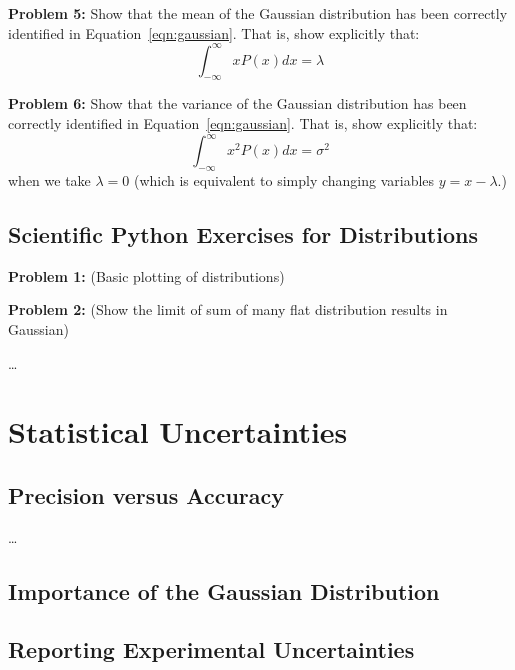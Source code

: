 \documentclass[12pt]{article}
\begin{document}
\vskip 1cm
\noindent
{\bf Problem 5:} Show that the mean of the Gaussian distribution has been correctly identified in Equation~\ref{eqn:gaussian}.  That is, show explicitly that:
\begin{displaymath}
\int_{-\infty}^{\infty} x P(x) dx = \lambda 
\end{displaymath}

\vskip 1cm
\noindent
{\bf Problem 6:} Show that the variance of the Gaussian distribution has been correctly identified in Equation~\ref{eqn:gaussian}.  That is, show explicitly that:
\begin{displaymath}
\int_{-\infty}^{\infty} x^2 P(x) dx = \sigma^2 
\end{displaymath}
when we take $\lambda=0$ (which is equivalent to simply changing variables $y=x-\lambda$.)
   
%

\newpage
\subsection{Scientific Python Exercises for Distributions}

{\bf Problem 1:}  (Basic plotting of distributions)

{\bf Problem 2:}  (Show the limit of sum of many flat distribution results in Gaussian)

\ldots

\newpage

\section{Statistical Uncertainties}

\subsection{Precision versus Accuracy}

\ldots
\subsection{Importance of the Gaussian Distribution}

\subsection{Reporting Experimental Uncertainties}
\end{document}
